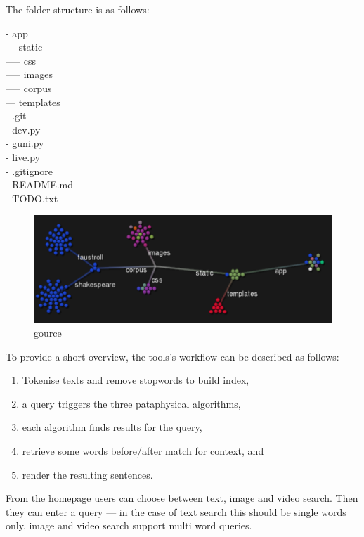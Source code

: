 The folder structure is as follows:

- app\\
--- static\\
----- css\\
----- images\\
----- corpus\\
--- templates\\
- .git\\
- dev.py\\
- guni.py\\
- live.py\\
- .gitignore\\
- README.md\\
- TODO.txt

\begin{figure}[htb] %
  \centering
  \includegraphics[width=\linewidth]{images/gource}
\caption[gource]{gource}
\label{img:gource}
\end{figure}


\begin{fcom}
  To provide a short overview, the tools’s workflow can be described as follows:
  \begin{enumerate}
    \item Tokenise texts and remove stopwords to build index,
    \item a query triggers the three pataphysical algorithms,
    \item each algorithm finds results for the query,
    \item retrieve some words before/after match for context, and
    \item render the resulting sentences.
  \end{enumerate}
\end{fcom}


From the homepage users can choose between text, image and video search. Then they can enter a query --- in the case of text search this should be single words only, image and video search support multi word queries.


